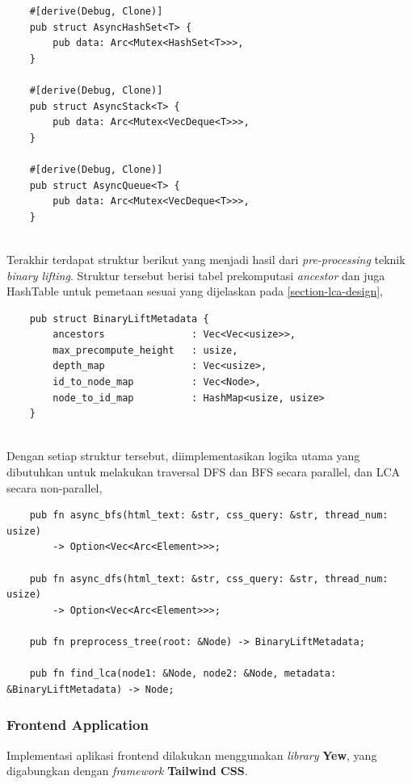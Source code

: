 \documentclass[12pt,a4paper]{article}
\begin{document}
\begin{itemize}
\begin{verbatim}
    #[derive(Debug, Clone)]
    pub struct AsyncHashSet<T> {
        pub data: Arc<Mutex<HashSet<T>>>,
    }

    #[derive(Debug, Clone)]
    pub struct AsyncStack<T> {
        pub data: Arc<Mutex<VecDeque<T>>>,
    }

    #[derive(Debug, Clone)]
    pub struct AsyncQueue<T> {
        pub data: Arc<Mutex<VecDeque<T>>>,
    }
\end{verbatim} \\


Terakhir terdapat struktur berikut yang menjadi hasil dari \textit{pre-processing} teknik \textit{binary lifting}. 
Struktur tersebut berisi tabel prekomputasi \textit{ancestor} dan juga HashTable untuk pemetaan sesuai yang dijelaskan pada \ref{section-lca-design},
\begin{verbatim}
    pub struct BinaryLiftMetadata {
        ancestors               : Vec<Vec<usize>>,
        max_precompute_height   : usize,
        depth_map               : Vec<usize>, 
        id_to_node_map          : Vec<Node>,
        node_to_id_map          : HashMap<usize, usize>
    }
\end{verbatim} \\


Dengan setiap struktur tersebut, diimplementasikan logika utama yang dibutuhkan untuk melakukan
traversal DFS dan BFS secara parallel, dan LCA secara non-parallel,
\begin{verbatim}
    pub fn async_bfs(html_text: &str, css_query: &str, thread_num: usize) 
        -> Option<Vec<Arc<Element>>>;

    pub fn async_dfs(html_text: &str, css_query: &str, thread_num: usize) 
        -> Option<Vec<Arc<Element>>>;

    pub fn preprocess_tree(root: &Node) -> BinaryLiftMetadata;

    pub fn find_lca(node1: &Node, node2: &Node, metadata: &BinaryLiftMetadata) -> Node;
\end{verbatim}


\subsubsection{Frontend Application}

Implementasi aplikasi frontend dilakukan menggunakan \textit{library} \textbf{Yew}, 
yang digabungkan dengan \textit{framework} \textbf{Tailwind CSS}. \\


\end{itemize}
\end{document}
